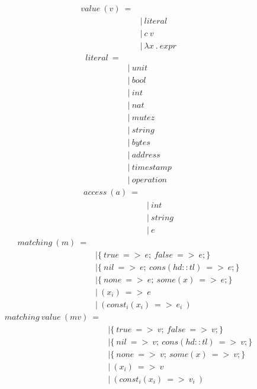 \documentclass[10pt,a4paper]{article}
\begin{document}
\begin{align*}
value\ (v)\ = 
\\
 \ &|\ literal                          \tag{values\ of\ built-in\ types}
\\
 \ &|\ c\ v                              \tag{values\ of\ construct\ types}
\\
 \ &|\ \lambda x\ .\ expr                        \tag{lambda}
\end{align*}
\begin{align*}
literal\ =
\\
 \ &|\ unit                             \tag{}
\\
 \ &|\ bool                             \tag{}
\\
 \ &|\ int                              \tag{}
\\
 \ &|\ nat                              \tag{}
\\
 \ &|\ mutez                            \tag{}
\\
 \ &|\ string                           \tag{}
\\
 \ &|\ bytes                            \tag{}
\\
 \ &|\ address                          \tag{}
\\
 \ &|\ timestamp                        \tag{}
\\
 \ &|\ operation                        \tag{}
\end{align*}
\begin{align*}
access\ (a)\ = 
\\
 \ &|\ int                              \tag{for\ tuples}
\\
 \ &|\ string                           \tag{for\ record}
\\
 \ &|\ e                                \tag{for\ map}
\end{align*}
\begin{align*}
matching\ (m)\ = 
\\
 \ &| \{\ true\ =>\ e;\ false\ =>\ e;\}        \tag{match\ bool}
\\
 \ &| \{\ nil \ =>\ e;\ cons(hd::tl)\ =>\ e;\} \tag{match\ list}
\\
 \ &| \{\ none\ =>\ e;\ some(x) \ =>\ e;\}     \tag{match\ option}
\\
 \ &|\ (x_i) \ =>\ e                      \tag{match\ tuple}
\\
 \ &|\ (const_i(x_i)\ =>\ e_i\ )           \tag{match\ variant}
\end{align*}
\begin{align*}
matching\ value\ (mv)\ = 
\\
 \ &| \{\ true\ =>\ v;\ false\ =>\ v;\}        \tag{match\ bool\ value}
\\
 \ &| \{\ nil \ =>\ v;\ cons(hd::tl)\ =>\ v;\} \tag{match\ list\ value}
\\
 \ &| \{\ none\ =>\ v;\ some(x) \ =>\ v;\}     \tag{match\ option\ value}
\\
 \ &|\ (x_i) \ =>\ v                      \tag{match\ tuple\ value}
\\
 \ &|\ (const_i(x_i)\ =>\ v_i\ )           \tag{match\ variant\ value}
\end{align*}
\newpage
\end{document}
